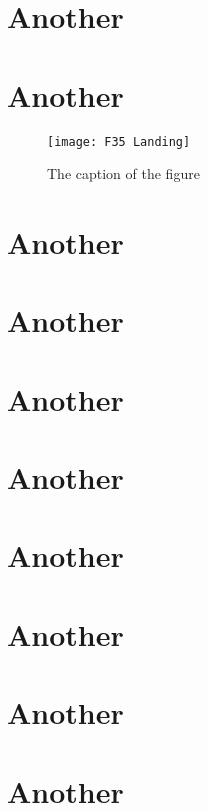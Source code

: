 \documentclass[12pt, oneside]{report}
\providecommand{\main}{.}
\begin{document}
\chapter{Another}
\chapter{Another}
\begin{figure}[h]
  \centering
  \texttt{[image: F35 Landing]}
  \caption{The caption of the figure}
  \label{fig:BlockDiagram4}
\end{figure}
\chapter{Another}
\chapter{Another}
\chapter{Another}
\chapter{Another}
\chapter{Another}
\chapter{Another}
\chapter{Another}
\chapter{Another}



\backmatter



\end{document}
